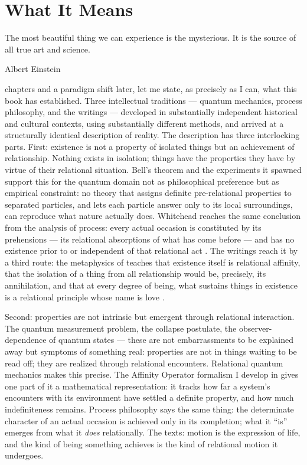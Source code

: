 \chapter{What It Means}
\label{ch:what-it-means}

\epigraph{The most beautiful thing we can experience is the mysterious.
  It is the source of all true art and science.}{Albert Einstein}

 chapters and a paradigm shift later, let me state, as precisely as
I can, what this book has established.
Three intellectual traditions --- quantum mechanics, process philosophy, and the
\bahai writings --- developed in substantially independent historical and cultural
contexts, using substantially different methods, and arrived at a structurally
identical description of reality.  The description has three interlocking parts.
First: existence is not a property of isolated things but an achievement of
relationship.  Nothing exists in isolation; things have the properties they have
by virtue of their relational situation.  Bell's theorem \citep{Bell1964} and the
experiments it spawned \citep{Aspect1982,Zeilinger2023Nobel} support this for
the quantum domain not as philosophical preference but as empirical constraint:
no theory that assigns definite pre-relational properties to separated particles,
and lets each particle answer only to its local surroundings, can reproduce
what nature actually does.  Whitehead reaches the same conclusion
from the analysis of process: every actual occasion is constituted by its
prehensions --- its relational absorptions of what has come before --- and has
no existence prior to or independent of that relational act
\citep{Whitehead1929,Whitehead1933}.  The \bahai writings reach it by a third
route: the metaphysics of \mahabbat teaches that existence itself is relational
affinity, that the isolation of a thing from all relationship would be, precisely,
its annihilation, and that at every degree of being, what sustains things in
existence is a relational principle whose name is love \citep{PUP,SAQ}.

Second: properties are not intrinsic but emergent through relational interaction.
The quantum measurement problem, the collapse postulate, the observer-dependence
of quantum states --- these are not embarrassments to be explained away but
symptoms of something real: properties are not in things waiting to be read
off; they are realized through relational encounters.  Relational quantum
mechanics \citep{Rovelli1996} makes this precise.  The Affinity Operator formalism
I develop in \citet{AdamsRCT} gives one part of it a mathematical representation:
it tracks how far a system's encounters with its environment have settled a
definite property, and how much indefiniteness remains.  Process
philosophy says the same thing: the determinate character of an actual occasion
is achieved only in its completion; what it ``is'' emerges from what it
\emph{does} relationally.  The \bahai texts: motion is the expression of
life, and the kind of being something achieves is the kind of relational motion
it undergoes.

